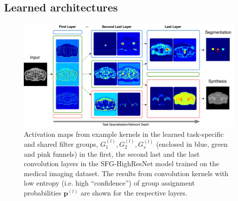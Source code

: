 




\subsection{Learned architectures} \label{sec:learned_architecture}

\begin{figure}[ht]
	\center
	\includegraphics[width=\linewidth]{chapter_6/figures/FINAL.pdf}
	\caption{\footnotesize Activation maps from example kernels in the learned task-specific and shared filter groups, $G^{(l)}_{1}, G^{(l)}_{2}, G^{(l)}_{s}$ (enclosed in blue, green and pink funnels) in the first, the second last and the last convolution layers in the SFG-HighResNet model trained on the medical imaging dataset. The results from convolution kernels with low entropy (i.e. high ``confidence'') of group assignment probabilities $\mathbf{p}^{(l)}$  are shown for the respective layers.  }
	\label{fig:activations}
\end{figure}

